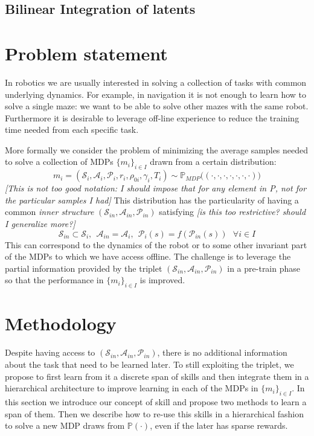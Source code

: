\documentclass{article} %
\begin{document}
\subsection{Bilinear Integration of latents}

\section{Problem statement}
In robotics we are usually interested in solving a collection of tasks with common underlying dynamics. For example, in navigation it is not enough to learn how to solve a single maze: we want to be able to solve other mazes with the same robot. Furthermore it is desirable to leverage off-line experience to reduce the training time needed from each specific task. 

More formally we consider the problem of minimizing the average samples needed to solve a collection of MDPs $\{m_i\}_{i\in I}$ drawn from a certain distribution:
\begin{equation}
    m_i = (\mathcal{S}_i, \mathcal{A}_i, \mathcal{P}_i, r_i, \rho_{0i}, \gamma_i, T_i) \sim \mathbb{P}_{MDP}\big( (\cdot, \cdot, \cdot, \cdot, \cdot, \cdot, \cdot) \big)
\end{equation}
\textit{[This is not too good notation: I should impose that for any element in P, not for the particular samples I had]}
This distribution has the particularity of having a common \textit{inner structure} $(\mathcal{S}_{in}, \mathcal{A}_{in}, \mathcal{P}_{in})$ satisfying \textit{[is this too restrictive? should I generalize more?]}
$$\mathcal{S}_{in} \subset \mathcal{S}_i,~~ \mathcal{A}_{in} = \mathcal{A}_i,~~ \mathcal{P}_i(s)=f(\mathcal{P}_{in}(s))~~~ \forall i\in I$$
This can correspond to the dynamics of the robot or to some other invariant part of the MDPs to which we have access offline. The challenge is to leverage the partial information provided by the triplet $(\mathcal{S}_{in}, \mathcal{A}_{in}, \mathcal{P}_{in})$ in a pre-train phase so that the performance in $\{m_i\}_{i\in I}$ is improved.

\section{Methodology}

Despite having access to $(\mathcal{S}_{in}, \mathcal{A}_{in}, \mathcal{P}_{in})$, there is no additional information about the task that need to be learned later. To still exploiting the triplet, we propose to first learn from it a discrete span of skills and then integrate them in a hierarchical architecture to improve learning in each of the MDPs in $\{m_i\}_{i\in I}$. In this section we introduce our concept of skill and propose two methods to learn a span of them. Then we describe how to re-use this skills in a hierarchical fashion to solve a new MDP draws from $\mathbb{P}(\cdot)$, even if the later has sparse rewards.
\end{document}
